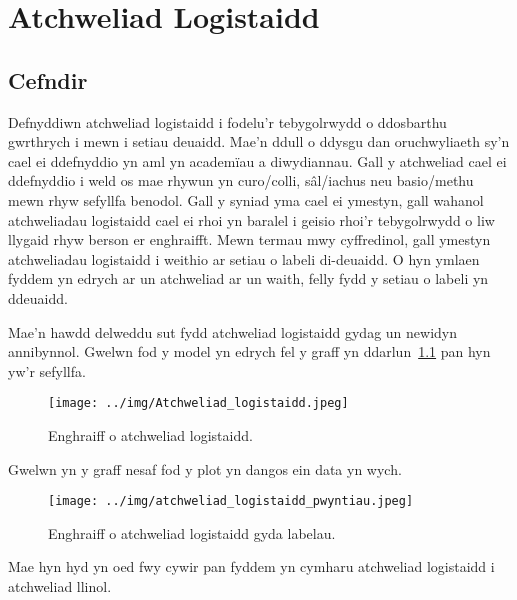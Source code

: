 \chapter{Atchweliad Logistaidd}\label{cha:Atchweliad_logistaidd}
\section{Cefndir}
Defnyddiwn atchweliad logistaidd i fodelu'r tebygolrwydd o ddosbarthu gwrthrych i mewn i setiau deuaidd. Mae'n ddull o ddysgu dan oruchwyliaeth sy'n cael ei ddefnyddio yn aml yn academ\"{i}au a diwydiannau. Gall y atchweliad cael ei ddefnyddio i weld os mae rhywun yn curo/colli, s\^{a}l/iachus neu basio/methu mewn rhyw sefyllfa benodol. Gall y syniad yma cael ei ymestyn, gall wahanol atchweliadau logistaidd cael ei rhoi yn baralel i geisio rhoi'r tebygolrwydd o liw llygaid rhyw berson er enghraifft. Mewn termau mwy cyffredinol, gall ymestyn atchweliadau logistaidd i weithio ar setiau o labeli di-deuaidd. O hyn ymlaen fyddem yn edrych ar un atchweliad ar un waith, felly fydd y setiau o labeli yn ddeuaidd. %

Mae'n hawdd delweddu sut fydd atchweliad logistaidd gydag un newidyn annibynnol. Gwelwn fod y model yn edrych fel y graff yn ddarlun~\ref{fig:Enghraifft_o_atchweliad_logistaidd} pan hyn yw'r sefyllfa.

\begin{figure}[H]
\begin{center}
\texttt{[image: ../img/Atchweliad\_logistaidd.jpeg]}
\label{fig:Enghraifft_o_atchweliad_logistaidd}
\caption{Enghraiff o atchweliad logistaidd.}
\end{center}
\end{figure}

Gwelwn yn y graff nesaf fod y plot yn dangos ein data yn wych. %

\begin{figure}[H]
\begin{center}
\texttt{[image: ../img/atchweliad\_logistaidd\_pwyntiau.jpeg]}
\label{fig:Enghraifft_o_atchweliad_logistaidd_pwyntiau}
\caption{Enghraiff o atchweliad logistaidd gyda labelau.}
\end{center}
\end{figure}

Mae hyn hyd yn oed fwy cywir pan fyddem yn cymharu atchweliad logistaidd i atchweliad llinol. %

